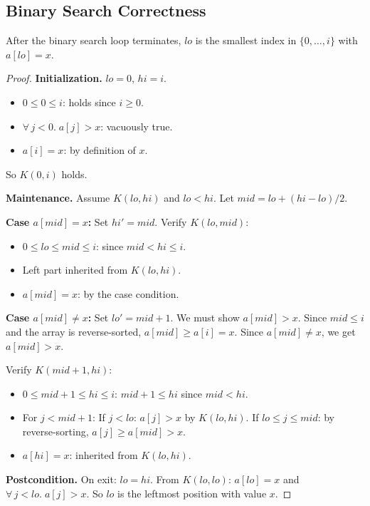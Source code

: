 \subsection{Binary Search Correctness}

\begin{lemma}\label{lem:search-correct}
After the binary search loop terminates, $\mathit{lo}$ is the smallest index
in $\{0, \ldots, i\}$ with $a[\mathit{lo}] = x$.
\end{lemma}

\begin{proof}
\textbf{Initialization.}
$\mathit{lo} = 0$, $\mathit{hi} = i$.
\begin{itemize}
  \item $0 \leq 0 \leq i$: holds since $i \geq 0$.
  \item $\forall\, j < 0.\; a[j] > x$: vacuously true.
  \item $a[i] = x$: by definition of $x$.
\end{itemize}
So $K(0, i)$ holds.

\textbf{Maintenance.}
Assume $K(\mathit{lo}, \mathit{hi})$ and $\mathit{lo} < \mathit{hi}$.
Let $\mathit{mid} = \mathit{lo} + (\mathit{hi} - \mathit{lo}) / 2$.

\textbf{Case $a[\mathit{mid}] = x$:}
Set $\mathit{hi}' = \mathit{mid}$. Verify $K(\mathit{lo}, \mathit{mid})$:
\begin{itemize}
  \item $0 \leq \mathit{lo} \leq \mathit{mid} \leq i$: since $\mathit{mid} < \mathit{hi} \leq i$.
  \item Left part inherited from $K(\mathit{lo}, \mathit{hi})$.
  \item $a[\mathit{mid}] = x$: by the case condition.
\end{itemize}

\textbf{Case $a[\mathit{mid}] \neq x$:}
Set $\mathit{lo}' = \mathit{mid} + 1$. We must show $a[\mathit{mid}] > x$.
Since $\mathit{mid} \leq i$ and the array is reverse-sorted,
$a[\mathit{mid}] \geq a[i] = x$. Since $a[\mathit{mid}] \neq x$, we get $a[\mathit{mid}] > x$.

Verify $K(\mathit{mid} + 1, \mathit{hi})$:
\begin{itemize}
  \item $0 \leq \mathit{mid} + 1 \leq \mathit{hi} \leq i$: $\mathit{mid} + 1 \leq \mathit{hi}$
    since $\mathit{mid} < \mathit{hi}$.
  \item For $j < \mathit{mid} + 1$:
    If $j < \mathit{lo}$: $a[j] > x$ by $K(\mathit{lo}, \mathit{hi})$.
    If $\mathit{lo} \leq j \leq \mathit{mid}$: by reverse-sorting, $a[j] \geq a[\mathit{mid}] > x$.
  \item $a[\mathit{hi}] = x$: inherited from $K(\mathit{lo}, \mathit{hi})$.
\end{itemize}

\textbf{Postcondition.}
On exit: $\mathit{lo} = \mathit{hi}$. From $K(\mathit{lo}, \mathit{lo})$:
$a[\mathit{lo}] = x$ and $\forall\, j < \mathit{lo}.\; a[j] > x$.
So $\mathit{lo}$ is the leftmost position with value $x$.
\end{proof}

